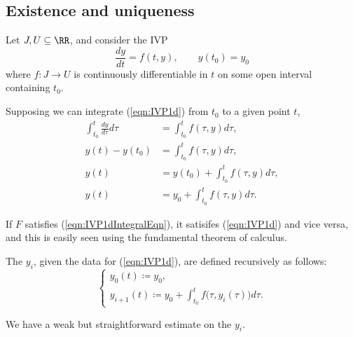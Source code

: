 \documentclass{article}
\begin{document}
\subsection{Existence and uniqueness}

Let $J, U \subseteq \RR$, and consider the IVP
\begin{equation}
    \label{eqn:IVP1d}
    \tag{IVP-$1$D}
    \frac{dy}{dt} = f(t,y),\qquad
    y(t_0)=y_0
\end{equation}
where $f: J \to U$ is continuously differentiable in $t$ on some open interval containing $t_0$.

Supposing we can integrate (\ref{eqn:IVP1d}) from $t_0$ to a given point $t$,
\begin{align*}
    \int_{t_0}^t \frac{dy}{d\tau}d\tau
    &=
    \int_{t_0}^t f(\tau, y)d\tau, \\
    y(t)-y(t_0)
    &=
    \int_{t_0}^t f(\tau, y)d\tau, \\
    \label{eqn:IVP1dIntegralEqn}
    \tag{$\int$IVP-$1$D}
    y(t)
    &=
    y(t_0) + \int_{t_0}^t f(\tau, y)d\tau, \\
    y(t)
    &=
    y_0 + \int_{t_0}^t f(\tau, y)d\tau.
\end{align*}

If $F$ satisfies (\ref{eqn:IVP1dIntegralEqn}), it satisifes (\ref{eqn:IVP1d}) and vice versa, and this is easily seen using the fundamental theorem of calculus.

\begin{definition}
    The  $y_i$, given the data for (\ref{eqn:IVP1d}), are defined recursively as follows:
    \begin{equation}
        \label{eqn:PicardIter}
        \tag{PicardIter}
        \begin{cases}
            y_0(t) \coloneq y_0, \\
            y_{i+1}(t) \coloneq y_0 + \int_{t_0}^tf\big(\tau,y_i(\tau)\big)d\tau.
        \end{cases}
    \end{equation}
\end{definition}

We have a weak but straightforward estimate on the $y_i$.
\end{document}
